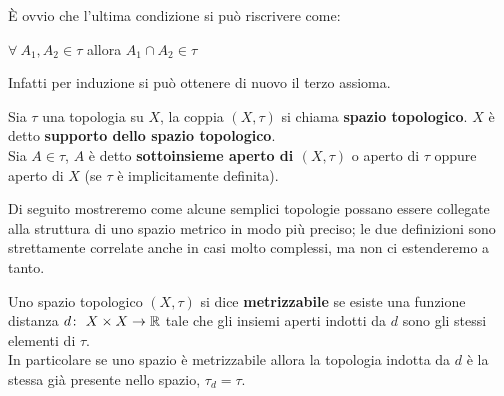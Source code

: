 \begin{remark}
	È ovvio che l'ultima condizione si può riscrivere come: 
	\begin{center}
		$\forall \ A_1, A_2 \in \tau$ allora $A_1 \cap A_2 \in \tau$ 
	\end{center}
	Infatti per induzione si può ottenere di nuovo il terzo assioma. 
\end{remark}

\begin{definition}
	Sia $\tau$ una topologia su $X$, la coppia $(X, \tau)$ si chiama \textbf{spazio topologico}. $X$ è detto \textbf{supporto dello spazio topologico}. \\ Sia $A \in \tau$, $A$ è detto \textbf{sottoinsieme aperto di $(X,\tau)$} o aperto di $\tau$ oppure aperto di $X$ (se $\tau$ è implicitamente definita). 	
\end{definition}


Di seguito mostreremo come alcune semplici topologie possano essere collegate alla struttura di uno spazio metrico in modo più preciso; le due definizioni sono strettamente correlate anche in casi molto complessi, ma non ci estenderemo a tanto.

\begin{definition}
	Uno spazio topologico $(X,\tau)$ si dice \textbf{metrizzabile} se esiste una funzione distanza $d \colon\ X\times X \rightarrow \mathbb{R}$ tale che gli insiemi aperti indotti da $d$ sono gli stessi elementi di $\tau$. \\ In particolare se uno spazio è metrizzabile allora la topologia indotta da $d$ è la stessa già presente nello spazio, $\tau_d  = \tau$. 
\end{definition}

